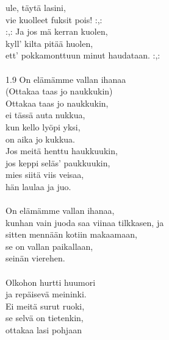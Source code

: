 ule, täytä lasini, \\ vie kuolleet fuksit pois! :,: \\ :,: Ja jos mä kerran kuolen, \\ kyll' kilta pitää huolen, \\ ett' pokkamonttuun minut haudataan. :,: \\ \hspace{10mm} \\ 1.9 On elämämme vallan ihanaa \\ (Ottakaa taas jo naukkukin) \\ Ottakaa taas jo naukkukin, \\ ei tässä auta nukkua, \\ kun kello lyöpi yksi, \\ on aika jo kukkua. \\ Jos meitä henttu haukkuukin, \\ jos keppi seläs' paukkuukin, \\ mies siitä viis veisaa, \\ hän laulaa ja juo. \\ \hspace{10mm} \\ On elämämme vallan ihanaa, \\ kunhan vain juoda saa viinaa tilkkasen,  ja  \\ sitten mennään kotiin makaamaan,  \\ se on vallan paikallaan,  \\ seinän vierehen. \\ \hspace{10mm} \\ Olkohon hurtti huumori \\ ja repäisevä meininki. \\ Ei meitä surut ruoki, \\ se selvä on tietenkin, \\ ottakaa lasi pohjaan